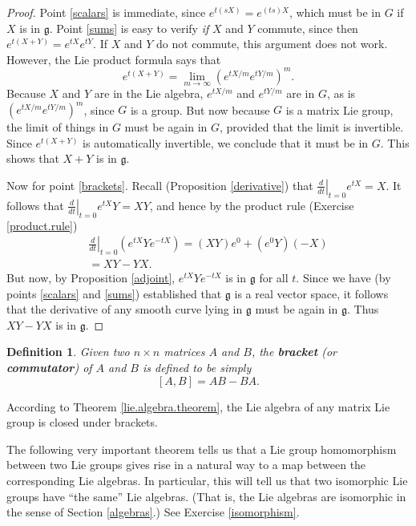 \documentclass[12pt]{amsbook}
\let \frak = \mathfrak
\theoremstyle{plain}
\newtheorem{definition}[theorem]{Definition}
\numberwithin{equation}{chapter}
\numberwithin{theorem}{chapter}
\begin{document}
\begin{proof}
Point \ref{scalars} is immediate, since $e^{t(sX)}=e^{(ts)X}$, which must be
in $G$ if $X$ is in $\frak{g}$. Point \ref{sums} is easy to verify \textit{if}
$X$ and $Y$ commute, since then $e^{t(X+Y)}=e^{tX}e^{tY}$. If $X$ and $Y$ do
not commute, this argument does not work. However, the Lie product formula
says that
\[
e^{t(X+Y)}=\lim_{m\rightarrow\infty}\left(  e^{tX/m}e^{tY/m}\right)
^{m}\text{.}%
\]
Because $X$ and $Y$ are in the Lie algebra, $e^{tX/m}$ and $e^{tY/m}$ are in
$G$, as is $\left(  e^{tX/m}e^{tY/m}\right)  ^{m}$, since $G$ is a group. But
now because $G$ is a matrix Lie group, the limit of things in $G$ must be
again in $G$, provided that the limit is invertible. Since $e^{t(X+Y)}$ is
automatically invertible, we conclude that it must be in $G$. This shows that
$X+Y$ is in $\frak{g}$.

Now for point \ref{brackets}. Recall (Proposition \ref{derivative}) that
$\left.  \frac{d}{dt}\right|  _{t=0}e^{tX}=X$. It follows that $\left.
\frac{d}{dt}\right|  _{t=0}e^{tX}Y=XY$, and hence by the product rule
(Exercise \ref{product.rule})
\begin{align*}
\left.  \frac{d}{dt}\right|  _{t=0}\left(  e^{tX}Ye^{-tX}\right)
=(XY)e^{0}+(e^{0}Y)(-X)\\
=XY-YX\text{.}%
\end{align*}
But now, by Proposition \ref{adjoint}, $e^{tX}Ye^{-tX}$ is in $\frak{g}$ for
all $t$. Since we have (by points \ref{scalars} and \ref{sums}) established
that $\frak{g}$ is a real vector space, it follows that the derivative of any
smooth curve lying in $\frak{g}$ must be again in $\frak{g}$. Thus $XY-YX$ is
in $\frak{g}$.
\end{proof}

\begin{definition}
Given two $n\times n$ matrices $A$ and $B$, the \textbf{bracket} (or
\textbf{commutator}) of $A$ and $B$ is defined to be simply
\[
\left[  A,B\right]  =AB-BA\text{.}%
\]
\end{definition}

According to Theorem \ref{lie.algebra.theorem}, the Lie algebra of any matrix
Lie group is closed under brackets.

The following very important theorem tells us that a Lie group homomorphism
between two Lie groups gives rise in a natural way to a map between the
corresponding Lie algebras. In particular, this will tell us that two
isomorphic Lie groups have ``the same'' Lie algebras. (That is, the Lie
algebras are isomorphic in the sense of Section \ref{algebras}.) See Exercise
\ref{isomorphism}.
\end{document}

